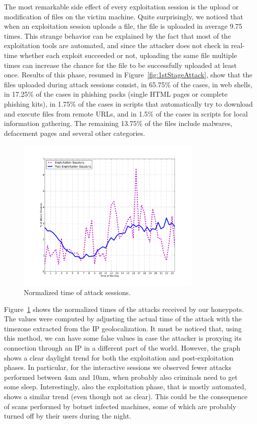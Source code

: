 The most remarkable side effect of every exploitation session is the upload or modification of files on the victim machine. Quite surprisingly, we noticed that when an exploitation session uploads a file, the file is uploaded in average 9.75 times. This strange behavior can be explained by the fact that most of the exploitation tools are automated, and since the attacker does not check in real-time whether each exploit succeeded or not, uploading the same file multiple times can increase the chance for the file to be successfully uploaded at least once. Results of this phase, resumed in Figure~\ref{fig:1stStageAttack}, show that the files uploaded during attack sessions consist, in 65.75\% of the cases, in web shells, in 17.25\% of the cases in phishing packs (single HTML pages or complete phishing kits), in 1.75\% of the cases in scripts that automatically try to download and execute files from remote URLs, and in 1.5\% of the cases in scripts for local information gathering. The remaining 13.75\% of the files include malwares, defacement pages and several other categories.

\begin{figure}[tbh]
\centerline{\includegraphics[width=0.8\textwidth]{Images/normalizedAttackTimes.png}}
\caption{Normalized time of attack sessions.\label{fig:normalizedAttackTimes}}
\end{figure}

Figure~\ref{fig:normalizedAttackTimes} shows the normalized times of the attacks received by our honeypots. The values were computed by adjusting the actual time of the attack with the timezone extracted from the IP geolocalization. It must be noticed that, using this method, we can have some false values in case the attacker is proxying its connection through an IP in a different part of the world. However, the graph shows a clear daylight trend for both the exploitation and post-exploitation phases. In particular, for the interactive sessions we observed fewer attacks performed between 4am and 10am, when probably also criminals need to get some sleep. Interestingly, also the exploitation phase, that is mostly automated, shows a similar trend (even though not as clear). This could be the consequence of scans performed by botnet infected machines, some of which are probably turned off by their users during the night.

